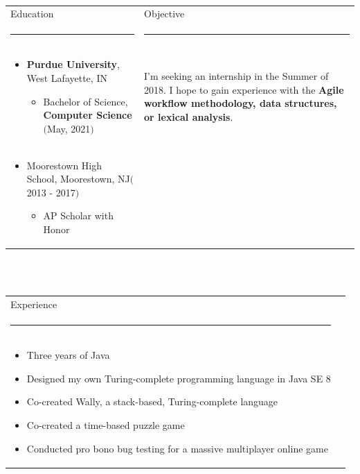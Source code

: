 \documentclass[11pt]{article}
\begin{document}
	\vspace{20pt}\\
	\begin{tabular}{p{4.5in}|p{3in}}
		{\fontfamily{lmdh}\fontsize{24}{28.8}\selectfont Education}
			& {\fontfamily{lmdh}\fontsize{24}{28.8}\selectfont Objective}\\
			\rule{175pt}{2pt} & \rule{175pt}{2pt}\\
			\vspace{-10pt}
			\begin{itemize}
				\item \textbf{Purdue University}, West Lafayette, IN
				\begin{itemize}
					\item \vspace{-5pt}Bachelor of Science, \textbf{Computer Science} \hfill$($May, 2021$)$
				\end{itemize}
			\end{itemize}
			& I'm seeking an internship in the Summer of 2018. I hope to gain experience with the \textbf{Agile workflow methodology, data structures, or lexical analysis}.\\
			\vspace{-30pt}
			\begin{itemize}
				\item Moorestown High School, Moorestown, NJ\hfill$($2013 - 2017$)$
				\begin{itemize}
					\item \vspace{-5pt}AP Scholar with Honor
				\end{itemize}
			\end{itemize}
			& \\
	\end{tabular}\\
	\\
	\begin{tabular}{p{3.92in}p{3.92in}}
		{\fontfamily{lmdh}\fontsize{24}{28.8}\selectfont Experience} & \\
		\rule{175pt}{2pt} & \\
			\vspace{-10pt}
		\raggedright
		\begin{itemize}
			\item Three years of Java
			\item Designed my own Turing-complete programming language in Java SE 8
			\item Co-created Wally, a stack-based, Turing-complete language
			\item Co-created a time-based puzzle game
			\item Conducted pro bono bug testing for a massive multiplayer online game
		\end{itemize}
	\end{tabular}\\
\end{document}
